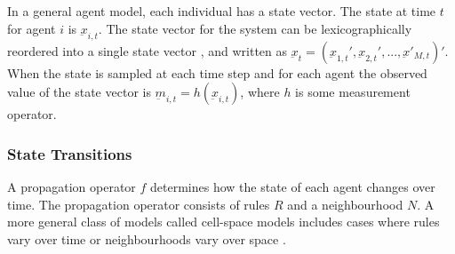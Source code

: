  In a general agent model, each individual has a state vector. %
 The state at time $t$ for agent $i$ is $\underbar{x}_{i,t}$. %
The state vector for the system can be lexicographically reordered into a single state vector \cite{fieguth_statistical_2010}, and written as $\underbar{x}_t = (\underbar{x}_{1,t}',\underbar{x}_{2,t}',...,\underbar{x}'_{M,t})'$.  %
When the state is sampled at each time step and for each agent the observed value of the state vector is $\underbar{m}_{i,t}= h(\underbar{x}_{i,t})$, where $h$ is some measurement operator.


\subsubsection{State Transitions}

A propagation operator $f$ %
determines how the state of each agent changes over time. The propagation operator consists of rules $R$ and a neighbourhood $N$.  A more general  class of models called cell-space models  includes cases where rules vary over time or neighbourhoods vary over space \cite{zeigler_discrete_1982}. %
 

